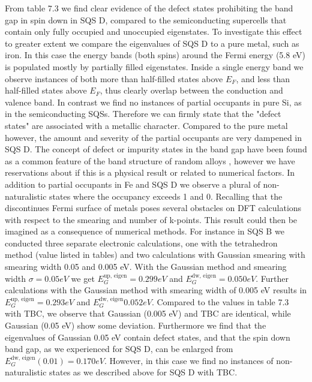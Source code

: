 From table 7.3 we find clear evidence of the defect states prohibiting the band gap in spin down in SQS D, compared to the semiconducting supercells that contain only fully occupied and unoccupied eigenstates. To investigate this effect to greater extent we compare the eigenvalues of SQS D to a pure metal, such as iron. In this case the energy bands (both spins) around the Fermi energy (5.8 eV) is populated mostly by partially filled eigenstates. Inside a single energy band we observe instances of both more than half-filled states above $E_F$, and less than half-filled states above $E_F$, thus clearly overlap between the conduction and valence band. In contrast we find no instances of partial occupants in pure Si, as in the semiconducting SQSs. Therefore we can firmly state that the "defect states" are associated with a metallic character. Compared to the pure metal however, the amount and severity of the partial occupants are very dampened in SQS D. The concept of defect or impurity states in the band gap have been found as a common feature of the band structure of random alloys \cite{PhysRevLett.104.236403}, however we have reservations about if this is a physical result or related to numerical factors. In addition to partial occupants in Fe and SQS D we observe a plural of non-naturalistic states where the occupancy exceeds 1 and 0. Recalling that the discontinues Fermi surface of metals poses several obstacles on DFT calculations with respect to the smearing and number of k-points. This result could then be imagined as a consequence of numerical methods. For instance in SQS B we conducted three separate electronic calculations, one with the tetrahedron method (value listed in tables) and two calculations with Gaussian smearing with smearing width 0.05 and 0.005 eV. With the Gaussian method and smearing width $\sigma = 0.05 eV$ we get $E_G ^\text{up, eigen} = 0.299 eV$ and $E_G ^\text{dw, eigen} = 0.050 eV$. Further calculations with the Gaussian method with smearing width of 0.005 eV results in $E_G ^\text{up, eigen} = 0.293 eV$ and $E_G ^\text{dw, eigen} 0.052 eV$. Compared to the values in table 7.3 with TBC, we observe that Gaussian (0.005 eV) and TBC are identical, while Gaussian (0.05 eV) show some deviation. Furthermore we find that the eigenvalues of Gaussian 0.05 eV contain defect states, and that the spin down band gap, as we experienced for SQS D, can be enlarged from $E_G ^\text{dw, eigen}(0.01) = 0.170 eV$. However, in this case we find no instances of non-naturalistic states as we described above for SQS D with TBC.
  

